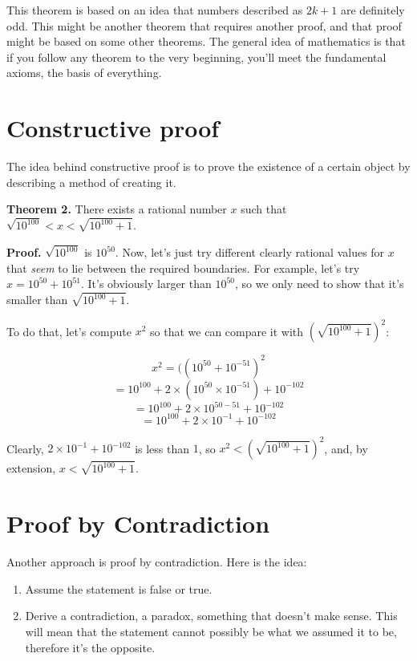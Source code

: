\documentclass[12pt, a4paper, justified, notitlepage, sfsidenotes, notoc]{book}
\begin{document}
This theorem is based on an idea that numbers described as \(2k + 1\) are definitely odd. This might be another theorem that requires another proof, and that proof might be based on some other theorems. The general idea of mathematics is that if you follow any theorem to the very beginning, you'll meet the fundamental axioms, the basis of everything.

\section{Constructive proof}
\label{sec:org71fb716}

The idea behind constructive proof is to prove the existence of a certain object by describing a method of creating it.

\textbf{Theorem 2.} There exists a rational number \(x\) such that \(\sqrt{10^{100}} < x < \sqrt{10^{100}+1}\).

\textbf{Proof.} \(\sqrt{10^{100}}\) is \(10^{50}\). Now, let's just try different clearly rational values for \(x\) that \emph{seem} to lie between the required boundaries. For example, let's try \(x = 10^{50} + 10^{51}\). It's obviously larger than \(10^{50}\), so we only need to show that it's smaller than \(\sqrt{10^{100}+1}\).

To do that, let's compute \(x^{2}\) so that we can compare it with \((\sqrt{10^{100}+1})^{2}\):

$$ x^{2} = ((10^{50} + 10^{-51})^{2} $$
$$ = 10^{100} + 2 \times (10^{50} \times 10^{-51}) + 10^{-102} $$
$$ = 10^{100} + 2 \times 10^{50-51} + 10^{-102} $$
$$ = 10^{100} + 2 \times 10^{-1} + 10^{-102} $$

Clearly, \(2 \times 10^{-1} + 10^{-102}\) is less than \(1\), so \(x^{2} < (\sqrt{10^{100}+1})^{2}\), and, by extension, \(x < \sqrt{10^{100}+1}\).

\section{Proof by Contradiction}
\label{sec:org3e7e6ab}

Another approach is proof by contradiction. Here is the idea:

\begin{enumerate}
\item Assume the statement is false or true.
\item Derive a contradiction, a paradox, something that doesn't make sense. This will mean that the statement cannot possibly be what we assumed it to be, therefore it's the opposite.
\end{enumerate}
\end{document}
